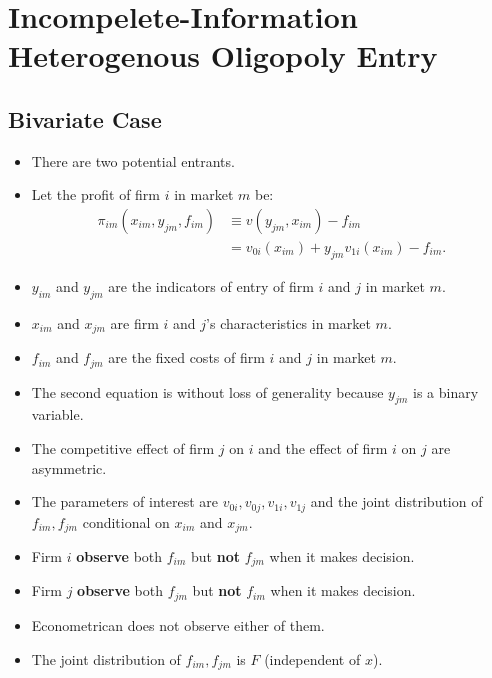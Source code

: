 \documentclass[
]{book}
\providecommand{\tightlist}{%
  \setlength{\itemsep}{0pt}\setlength{\parskip}{0pt}}
\begin{document}
\hypertarget{incompelete-information-heterogenous-oligopoly-entry}{%
\section{Incompelete-Information Heterogenous Oligopoly Entry}\label{incompelete-information-heterogenous-oligopoly-entry}}

\hypertarget{bivariate-case}{%
\subsection{Bivariate Case}\label{bivariate-case}}

\begin{itemize}
\tightlist
\item
  There are two potential entrants.
\item
  Let the profit of firm \(i\) in market \(m\) be:
  \[
  \begin{split}
  \pi_{im}(x_{im}, y_{jm}, f_{im}) & \equiv v(y_{jm}, x_{im}) - f_{im}\\
  &=v_{0i}(x_{im}) + y_{jm} v_{1i}(x_{im}) - f_{im}.
  \end{split}
  \]
\item
  \(y_{im}\) and \(y_{jm}\) are the indicators of entry of firm \(i\) and \(j\) in market \(m\).
\item
  \(x_{im}\) and \(x_{jm}\) are firm \(i\) and \(j\)'s characteristics in market \(m\).
\item
  \(f_{im}\) and \(f_{jm}\) are the fixed costs of firm \(i\) and \(j\) in market \(m\).
\item
  The second equation is without loss of generality because \(y_{jm}\) is a binary variable.
\item
  The competitive effect of firm \(j\) on \(i\) and the effect of firm \(i\) on \(j\) are asymmetric.
\item
  The parameters of interest are \(v_{0i}, v_{0j}, v_{1i}, v_{1j}\) and the joint distribution of \(f_{im}, f_{jm}\) conditional on \(x_{im}\) and \(x_{jm}\).
\item
  Firm \(i\) \textbf{observe} both \(f_{im}\) but \textbf{not} \(f_{jm}\) when it makes decision.
\item
  Firm \(j\) \textbf{observe} both \(f_{jm}\) but \textbf{not} \(f_{im}\) when it makes decision.
\item
  Econometrican does not observe either of them.
\item
  The joint distribution of \(f_{im}, f_{jm}\) is \(F\) (independent of \(x\)).
\end{itemize}
\end{document}
